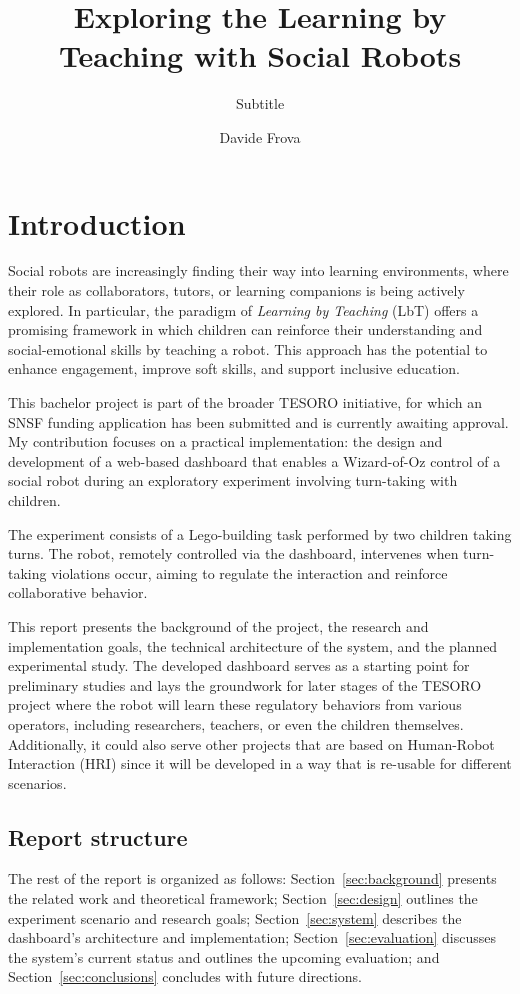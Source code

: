 \documentclass[a4paper]{usiinfbachelorproject}
\author{Davide Frova}
\title{\textbf{Exploring the Learning by Teaching with Social Robots}}
\subtitle{Subtitle}
\begin{document}
\maketitle
\tableofcontents\newpage

\section{\textbf{Introduction}}

Social robots are increasingly finding their way into learning environments, where their role as collaborators, tutors, or learning companions is being actively explored. In particular, the paradigm of \textit{Learning by Teaching} (LbT) offers a promising framework in which children can reinforce their understanding and social-emotional skills by teaching a robot. This approach has the potential to enhance engagement, improve soft skills, and support inclusive education.

This bachelor project is part of the broader TESORO initiative, for which an SNSF funding application has been submitted and is currently awaiting approval. My contribution focuses on a practical implementation: the design and development of a web-based dashboard that enables a Wizard-of-Oz control of a social robot during an exploratory experiment involving turn-taking with children.

The experiment consists of a Lego-building task performed by two children taking turns. The robot, remotely controlled via the dashboard, intervenes when turn-taking violations occur, aiming to regulate the interaction and reinforce collaborative behavior.

This report presents the background of the project, the research and implementation goals, the technical architecture of the system, and the planned experimental study.
The developed dashboard serves as a starting point for preliminary studies and lays the groundwork for later stages of the TESORO project where the robot will learn these regulatory behaviors from various operators, including researchers, teachers, or even the children themselves. Additionally, it could also serve other projects that are based on Human-Robot Interaction (HRI) since it will be developed in a way that is re-usable for different scenarios.

\subsection{\textbf{Report structure}}
The rest of the report is organized as follows: Section~\ref{sec:background} presents the related work and theoretical framework; Section~\ref{sec:design} outlines the experiment scenario and research goals; Section~\ref{sec:system} describes the dashboard's architecture and implementation; Section~\ref{sec:evaluation} discusses the system's current status and outlines the upcoming evaluation; and Section~\ref{sec:conclusions} concludes with future directions.
\end{document}

